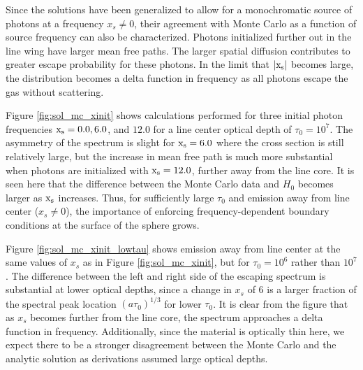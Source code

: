 \documentclass{aastex63}
\begin{document}
Since the solutions have been generalized to allow for a monochromatic source of photons at a frequency $x_s \neq 0$, their agreement with Monte Carlo as a function of source frequency can also be characterized. Photons initialized further out in the line wing have larger mean free paths. The larger spatial diffusion contributes to greater escape probability for these photons. In the limit that $|\rm x_s|$ becomes large, the distribution becomes a delta function in frequency as all photons escape the gas without scattering. 

Figure \ref{fig:sol_mc_xinit} shows calculations performed for three initial photon frequencies $\rm x_s = 0.0, 6.0$, and $12.0$ for a line center optical depth of $\tau_0=10^7$. The asymmetry of the spectrum is slight for $\rm x_s = 6.0$ where the cross section is still relatively large, but the increase in mean free path is much more substantial when photons are initialized with $\rm x_s=12.0$, further away from the line core. It is seen here that the difference between the Monte Carlo data and $H_0$ becomes larger as $\rm x_s$ increases. Thus, for sufficiently large $\tau_0$ and emission away from line center ($x_s \neq 0$), the importance of enforcing frequency-dependent boundary conditions at the surface of the sphere grows. 

Figure \ref{fig:sol_mc_xinit_lowtau} shows emission away from line center at the same values of $x_s$ as in Figure \ref{fig:sol_mc_xinit}, but for $\tau_0=10^6$ rather than $10^7$. The difference between the left and right side of the escaping spectrum is substantial at lower optical depths, since a change in $x_s$ of 6 is a larger fraction of the spectral peak location $(a\tau_0)^{1/3}$ for lower $\tau_0$. It is clear from the figure that as $x_s$ becomes further from the line core, the spectrum approaches a delta function in frequency. Additionally, since the material is optically thin here, we expect there to be a stronger disagreement between the Monte Carlo and the analytic solution as derivations assumed large optical depths.
\end{document}
